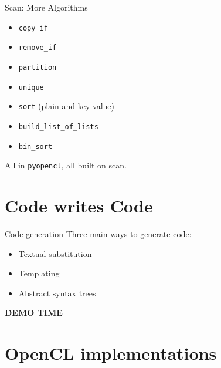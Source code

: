 \documentclass[english,compress]{beamer}
\def\bigncentered#1{
  \begin{center}
    \Huge\bfseries #1
  \end{center}
}
\begin{document}
\begin{frame}{Scan: More Algorithms}
  \begin{itemize}
    \item \texttt{copy\_if}
    \item \texttt{remove\_if}
    \item \texttt{partition}
    \item \texttt{unique}
    \item \texttt{sort} (plain and key-value)
    \item \texttt{build\_list\_of\_lists}
    \item \texttt{bin\_sort}
  \end{itemize}
  All in \texttt{pyopencl}, all built on scan.
\end{frame}

\section[Code gen.]{Code writes Code}
\begin{frame}{Code generation}
  Three main ways to generate code:
  \begin{itemize}
    \item Textual substitution
    \item Templating
    \item Abstract syntax trees
  \end{itemize}
\end{frame}
\begin{frame}
  \bigncentered{DEMO TIME}
\end{frame}
\section[]{OpenCL implementations}
\end{document}
